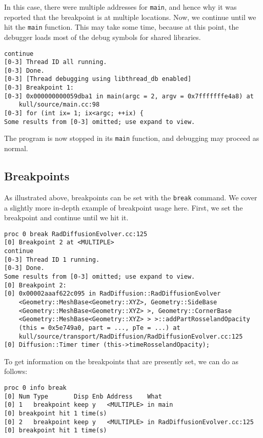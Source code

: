 \documentclass{refart}
\begin{document}
In this case, there were multiple addresses for \texttt{main}, and hence why it was reported that the breakpoint is at multiple locations. Now, we continue until we hit the \texttt{main} function. This may take some time, because at this point, the debugger loads most of the debug symbols for shared libraries.

\begin{Verbatim}
continue
[0-3] Thread ID all running.
[0-3] Done.
[0-3] [Thread debugging using libthread_db enabled]
[0-3] Breakpoint 1:
[0-3] 0x000000000059dba1 in main(argc = 2, argv = 0x7fffffffe4a8) at
    kull/source/main.cc:98
[0-3] for (int ix= 1; ix<argc; ++ix) {
Some results from [0-3] omitted; use expand to view.
\end{Verbatim}

The program is now stopped in its \texttt{main} function, and debugging may proceed as normal.

\subsection{Breakpoints}

As illustrated above, breakpoints can be set with the \texttt{break} command. We cover a slightly more in-depth example of breakpoint usage here. First, we set the breakpoint and continue until we hit it.

\begin{Verbatim}
proc 0 break RadDiffusionEvolver.cc:125  
[0] Breakpoint 2 at <MULTIPLE>
continue
[0-3] Thread ID 1 running.
[0-3] Done.
Some results from [0-3] omitted; use expand to view.
[0] Breakpoint 2:
[0] 0x00002aaaf622c095 in RadDiffusion::RadDiffusionEvolver
    <Geometry::MeshBase<Geometry::XYZ>, Geometry::SideBase
    <Geometry::MeshBase<Geometry::XYZ> >, Geometry::CornerBase
    <Geometry::MeshBase<Geometry::XYZ> > >::addPartRosselandOpacity
    (this = 0x5e749a0, part = ..., pTe = ...) at
    kull/source/transport/RadDiffusion/RadDiffusionEvolver.cc:125
[0] Diffusion::Timer timer (this->timeRosselandOpacity);
\end{Verbatim}

To get information on the breakpoints that are presently set, we can do as follows:

\begin{Verbatim}
proc 0 info break
[0] Num Type       Disp Enb Address    What
[0] 1   breakpoint keep y   <MULTIPLE> in main
[0] breakpoint hit 1 time(s)
[0] 2   breakpoint keep y   <MULTIPLE> in RadDiffusionEvolver.cc:125
[0] breakpoint hit 1 time(s)
\end{Verbatim}
\end{document}
